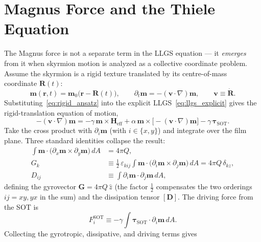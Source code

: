 \documentclass[11pt,a4paper]{article}
\newcommand{\mb}[1]{\mathbf{#1}}
\newcommand{\zhat}{\hat{z}}
\begin{document}
\section{Magnus Force and the Thiele Equation}

The Magnus force is not a separate term in the LLGS equation --- it
\emph{emerges} from it when skyrmion motion is analyzed as a
collective coordinate problem.  Assume the skyrmion is a
rigid texture translated by its centre-of-mass coordinate
$\mb{R}(t)$:
%
\begin{equation}
\mb{m}(\mb{r}, t) = \mb{m}_0\bigl(\mb{r} - \mb{R}(t)\bigr),
\qquad
\partial_t \mb{m} = -(\mb{v}\cdot\nabla)\mb{m},
\qquad
\mb{v} \equiv \dot{\mb{R}}.
\label{eq:rigid_ansatz}
\end{equation}
%
Substituting~\eqref{eq:rigid_ansatz} into the explicit
LLGS~\eqref{eq:llgs_explicit} gives the rigid-translation
equation of motion,
%
\begin{equation}
-(\mb{v}\cdot\nabla)\mb{m}
= -\gamma\,\mb{m}\times\mb{H}_{\text{eff}}
  + \alpha\,\mb{m}\times\bigl[-(\mb{v}\cdot\nabla)\mb{m}\bigr]
  - \gamma\,\bm{\tau}_{\text{SOT}}.
\label{eq:rigid_substituted}
\end{equation}
%
Take the cross product with $\partial_i\mb{m}$ (with
$i\in\{x,y\}$) and integrate over the film plane.  Three
standard identities collapse the result:
%
\begin{align}
\int \mb{m}\cdot
    \bigl(\partial_x\mb{m}\times\partial_y\mb{m}\bigr)\,dA
    &= 4\pi Q, \\
G_k &\equiv \tfrac{1}{2}\,\varepsilon_{kij}
    \!\int \mb{m}\cdot
        \bigl(\partial_i\mb{m}\times\partial_j\mb{m}\bigr)\,dA
    = 4\pi Q\,\delta_{kz},
    \label{eq:gyrovector}\\
D_{ij} &\equiv \int
    \partial_i\mb{m}\cdot\partial_j\mb{m}\,dA,
    \label{eq:dissipation_tensor}
\end{align}
%
defining the gyrovector $\mb{G}=4\pi Q\,\zhat$ (the factor
$\tfrac12$ compensates the two orderings $ij = xy, yx$ in the
sum) and the
dissipation tensor $[\mb{D}]$.  The driving force from the
SOT is
%
\begin{equation}
F^{\text{SOT}}_i \equiv -\gamma
    \!\int \bm{\tau}_{\text{SOT}}\cdot\partial_i\mb{m}\,dA.
\label{eq:force_sot}
\end{equation}
%
Collecting the gyrotropic, dissipative, and driving terms gives
\end{document}
